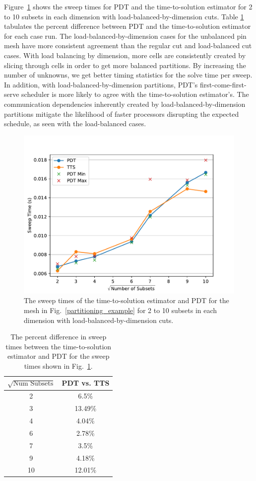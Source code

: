 \documentclass[times,final]{elsarticle}
\begin{document}
Figure~\ref{comp_lbd_spiderweb} shows the sweep times for PDT and the time-to-solution estimator for 2 to 10 subsets in each dimension with load-balanced-by-dimension cuts.
Table \ref{diff_lbd_spiderweb} tabulates the percent difference between PDT and the time-to-solution estimator for each case run.
The load-balanced-by-dimension cases for the unbalanced pin mesh have more consistent agreement than the regular cut and load-balanced cut cases.
With load balancing by dimension, more cells are consistently created by slicing through cells in order to get more balanced partitions.
By increasing the number of unknowns, we get better timing statistics for the solve time per sweep.
In addition, with load-balanced-by-dimension partitions, PDT's first-come-first-serve scheduler is more likely to agree with the time-to-solution estimator's.
The communication dependencies inherently created by load-balanced-by-dimension partitions mitigate the likelihood of faster processors disrupting the expected schedule, as seen with the load-balanced cases.
\begin{figure}[!ht]
  \centering
  \includegraphics[scale=0.75]{../figures/spiderweb_lbd_pdtvtts.pdf}
  \caption{The sweep times of the time-to-solution estimator and PDT for the mesh in Fig.~\ref{partitioning_example} for 2 to 10 subsets in each dimension with load-balanced-by-dimension cuts.}
\label{comp_lbd_spiderweb}
\end{figure}
\begin{table}[!ht]
\centering
\caption{The percent difference in sweep times between the time-to-solution estimator and PDT for the sweep times shown in Fig.~\ref{comp_lbd_spiderweb}.}
\label{diff_lbd_spiderweb}
\begin{tabular}{c|c}
\textbf{$\sqrt{\text{Num Subsets}}$} & \bf PDT vs. TTS \\ \hline
2&6.5\%\\ \hline
3&13.49\%\\ \hline
4&4.04\%\\ \hline
6&2.78\%\\ \hline
7&3.5\%\\ \hline
9&4.18\%\\ \hline
10&12.01\%
\end{tabular}
\end{table}
\end{document}
